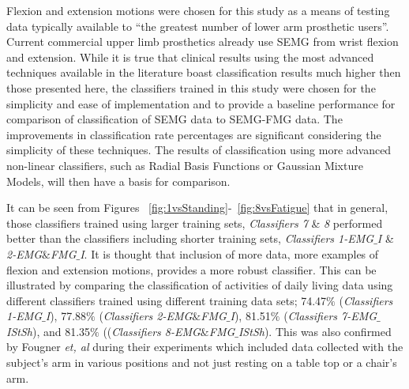 \documentclass[twocolumn]{sagej}
\begin{document}
Flexion and extension motions were chosen for this study as a means of testing data typically available to ``the greatest number of lower arm prosthetic users''.  Current commercial upper limb prosthetics already use SEMG from wrist flexion and extension.  While it is true that clinical results using the most advanced techniques available in the literature boast classification results much higher then those presented here, the classifiers trained in this study were chosen for the simplicity and ease of implementation and to provide a baseline performance for comparison of classification of SEMG data to SEMG-FMG data.  The improvements in classification rate percentages are significant considering the simplicity of these techniques. The results of classification using more advanced non-linear classifiers, such as Radial Basis Functions or Gaussian Mixture Models, will then have a basis for comparison.  \par \noindent%
It can be seen from Figures ~\ref{fig:1vsStanding}-~\ref{fig:8vsFatigue} that in general, those classifiers trained using larger training sets, \textit{Classifiers 7} \& \textit{8} performed better than the classifiers including shorter training sets, \textit{Classifiers 1-EMG$\_$I} \& \textit{2-EMG$\&$FMG$\_$I}.  It is thought that inclusion of more data, more examples of flexion and extension motions, provides a more robust classifier.  This can be illustrated by comparing the classification of activities of daily living data using different classifiers trained using different training data sets; 74.47$\%$ (\textit{Classifiers 1-EMG$\_$I}), 77.88$\%$ (\textit{Classifiers 2-EMG$\&$FMG$\_$I}), 81.51$\%$ (\textit{Classifiers 7-EMG$\_$IStSh}), and 81.35$\%$ ((\textit{Classifiers 8-EMG$\&$FMG$\_$IStSh}).  This was also confirmed by Fougner \textit{et, al} during their experiments which included data collected with the subject's arm in various positions and not just resting on a table top or a chair's arm. \par \noindent
\end{document}
